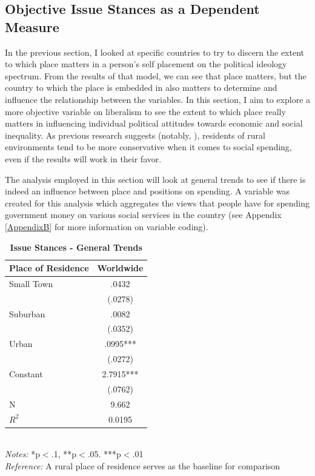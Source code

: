 \documentclass[12pt, titlepage]{article}
\newcommand\e{\emph}
\newcommand\tb{\textbf}
\begin{document}
\subsection{Objective Issue Stances as a Dependent Measure}

In the previous section, I looked at specific countries to try to discern the extent to which place matters in a person's self placement on the political ideology spectrum. From the results of that model, we can see that place matters, but the country to which the place is embedded in also matters to determine and influence the relationship between the variables. In this section, I aim to explore a more objective variable on liberalism to see the extent to which place really matters in influencing individual political attitudes towards economic and social inequality. As previous research suggests (notably, \cite{walsh_putting_2012}), residents of rural environments tend to be more conservative when it comes to social spending, even if the results will work in their favor. 

The analysis employed in this section will look at general trends to see if there is indeed an influence between place and positions on spending. A variable was created for this analysis which aggregates the views that people have for spending government money on various social services in the country (see Appendix \ref{AppendixB} for more information on variable coding). 

\begin{table}[h!]
	\centering
	\caption{\tb{Issue Stances - General Trends}}
	\begin{tabulary}{\linewidth}{l c}
		\\
		\hline
		\tb{Place of Residence} & \tb{Worldwide} \\
		\hline 
		Small Town&.0432 \\
		&(.0278)\\
		Suburban&.0082\\
		&(.0352) \\
		Urban&.0995*** \\
		&(.0272)\\
		Constant&2.7915*** \\
		&(.0762) \\
		N&9.662 \\
		$R^2$&0.0195 \\
		\hline
	\end{tabulary}
	\\
\e{Notes:} *p$<$.1, **p$<$.05. ***p$<$.01 \\
\e{Reference:} A rural place of residence serves as the baseline for comparison
\label{table14}
\end{table}
\end{document}
